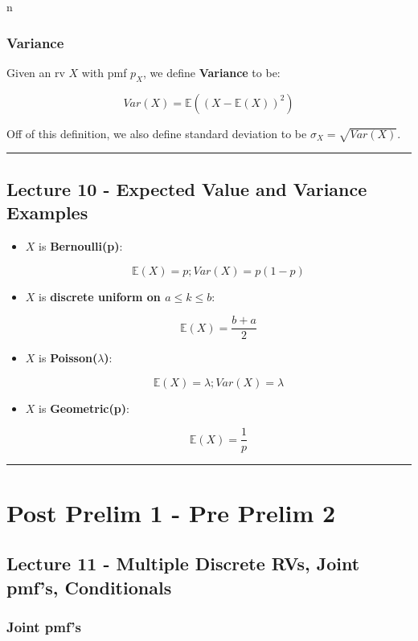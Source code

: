 n\documentclass{article}
\begin{document}
\subsubsection{Variance}

Given an rv $X$ with pmf $p_X$, we define \textbf{Variance} to be:

\begin{equation}
  \tag{Variance Def}
  \boxed{
    Var(X) = \mathbb{E}((X - \mathbb{E}(X))^2)
  }
\end{equation}

Off of this definition, we also define standard deviation to be
$\sigma_X = \sqrt{Var(X)}$.


\medskip\hrule
\subsection{Lecture 10 - Expected Value and Variance Examples}

\begin{itemize}
\item $X$ is \textbf{Bernoulli(p)}:

  \[
    \mathbb{E}(X) = p; Var(X) = p(1 - p)
  \]

\item $X$ is \textbf{discrete uniform on $a \le k \le b$}:

  \[
    \mathbb{E}(X) = \frac{b + a}{2}
  \]
  
\item $X$ is \textbf{Poisson($\lambda$)}:

  \[
    \mathbb{E}(X) = \lambda; Var(X) = \lambda
  \]

\item $X$ is \textbf{Geometric(p)}:

  \[
    \mathbb{E}(X) = \frac{1}{p}
  \]
\end{itemize}





\medskip\hrule
\pagebreak
\section{Post Prelim 1 - Pre Prelim 2}

\subsection{Lecture 11 - Multiple Discrete RVs, Joint pmf's,
  Conditionals}

\subsubsection{Joint pmf's}
\end{document}
